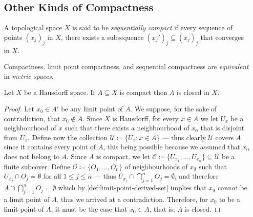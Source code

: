 \subsection{Other Kinds of Compactness}

\begin{definition}
\label{def:sequentially-compact}
A topological space \(X\) is said to be \emph{sequentially compact} if every
sequence of points \((x_j)_j\) in \(X\), there exists a subsequence \((x_j')_j
\subseteq (x_j)_j\) that converges in \(X\).
\end{definition}

\begin{proposition}
\label{prop:metric-space-compactness-equivalences}
Compactness, limit point compactness, and sequential compactness are
\emph{equivalent} in \emph{metric spaces}.
\end{proposition}


\begin{proposition}
\label{prop:hausdorff-compact-implies-closed}
Let \(X\) be a Hausdorff space. If \(A \subseteq X\) is compact then \(A\) is
closed in \(X\).
\end{proposition}

\begin{proof}
Let \(x_0 \in A'\) be any limit point of \(A\). We suppose, for the sake of
contradiction, that \(x_0 \notin A\). Since \(X\) is Hausdorff, for every \(x
\in A\) we let \(U_x\) be a neighbourhood of \(x\) such that there exists a
neighbourhood of \(x_0\) that is disjoint from \(U_x\). Define now the
collection \(\mathcal{U} \coloneq \{U_x : x \in A\}\) --- thus clearly
\(\mathcal{U}\) covers \(A\) since it contains every point of \(A\), this being
possible because we assumed that \(x_0\) does not belong to \(A\). Since \(A\)
is compact, we let \(\mathcal{C} \coloneq \{U_{x_1}, \dots, U_{x_n}\} \subseteq
\mathcal{U}\) be a finite subcover. Define \(\mathcal{O} \coloneq \{O_1, \dots,
O_n\}\) of neighbourhoods of \(x_0\) such that \(U_{x_j} \cap O_j = \emptyset\)
for all \(1 \leq j \leq n\) --- thus \(U_{x_j} \cap \bigcap_{j=1}^n O_j =
\emptyset\), and therefore \(A \cap \bigcap_{j=1}^n O_j = \emptyset\) which by
\cref{def:limit-point-derived-set} implies that \(x_0\) cannot be a limit point
of \(A\), thus we arrived at a contradiction. Therefore, for \(x_0\) to be a
limit point of \(A\), it must be the case that \(x_0 \in A\), that is, \(A\) is
closed.
\end{proof}

